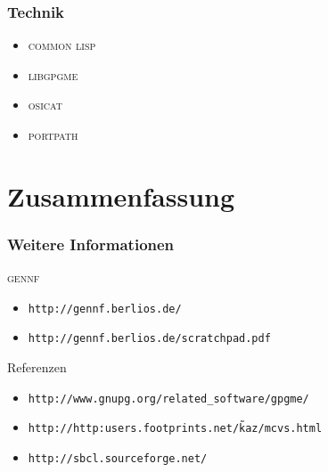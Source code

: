 \documentclass[german]{beamer}
\newcommand{\GENNF}{\textsc{gennf}}
\newcommand{\COMMONLISP}{\textsc{common lisp}}
\newcommand{\LIBGPGME}{\textsc{libgpgme}}
\newcommand{\OSICAT}{\textsc{osicat}}
\newcommand{\PORTPATH}{\textsc{portpath}}
\begin{document}
\begin{frame}
  \frametitle{Technik}
  \begin{itemize}
  \item \COMMONLISP
  \item \LIBGPGME
  \item \OSICAT
  \item \PORTPATH
  \end{itemize}
\end{frame}

\section{Zusammenfassung}

\begin{frame}
  \frametitle{Weitere Informationen}
  \begin{block}{\GENNF}
    \begin{itemize}
    \item \tt{http://gennf.berlios.de/}
    \item \tt{http://gennf.berlios.de/scratchpad.pdf}
    \end{itemize}
  \end{block}
  \begin{block}{Referenzen}
    \begin{itemize}
    \item \tt{http://www.gnupg.org/related\_software/gpgme/}
    \item \tt{http://http:users.footprints.net/\~kaz/mcvs.html}
    \item \tt{http://sbcl.sourceforge.net/}
    \end{itemize}
  \end{block}
\end{frame}
\end{document}
